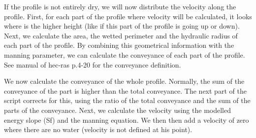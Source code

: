 \documentclass[letterpaper,10pt,english]{sphinxmanual}
\begin{document}
\begin{fulllineitems}
If the profile is not entirely dry, we will now distribute the velocity along the profile. First, for each part of
the profile where velocity will be calculated, it looks where is the higher height (like if this part of the profile
is going up or down). Next, we calculate the area, the wetted perimeter and the hydraulic radius of each part of the
profile. By combining this geometrical information with the manning parameter, we can calculate the conveyance
of each part of the profile. See manual of hec-ras p.4-20 for the conveyance definition.

We now calculate the conveyance of the whole profile. Normally, the sum of the conveyance of the part is higher
than the total conveyance. The next part of the script corrects for this, using the ratio of the total conveyance
and the sum of the parts of the conveyance. Next, we calculate the velocity using the modelled energy slope (Sf)
and the manning equation. We then then add a velocity of zero where there are no water (velocity is not defined
at his point).

\end{fulllineitems}

\end{document}
